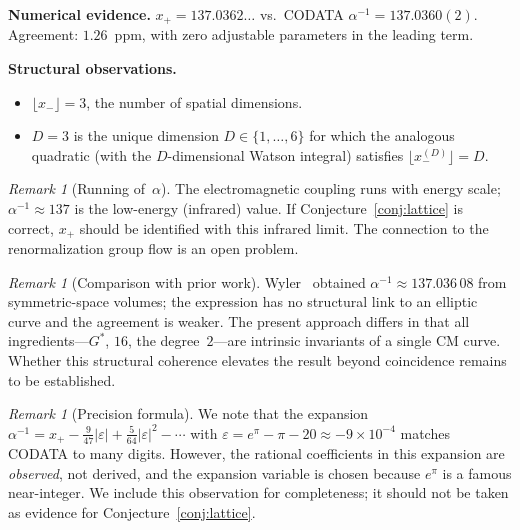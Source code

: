 \documentclass[12pt,reqno]{amsart}
\theoremstyle{definition}
\theoremstyle{remark}
\newtheorem{remark}[theorem]{Remark}
\newcommand{\Gstar}{G^{\!*}}
\newcommand{\abs}[1]{\lvert #1 \rvert}
\begin{document}
\noindent\textbf{Numerical evidence.}
$x_{+}=137.0362\ldots$ vs.\ CODATA $\alpha^{-1}=137.0360(2)$.
Agreement: $1.26$~ppm, with zero adjustable parameters in the leading term.

\smallskip\noindent\textbf{Structural observations.}
\begin{itemize}
  \item $\lfloor x_{-}\rfloor = 3$, the number of spatial dimensions.
  \item $D=3$ is the unique dimension $D\in\{1,\ldots,6\}$ for which the
    analogous quadratic (with the $D$-dimensional Watson integral) satisfies
    $\lfloor x_{-}^{(D)}\rfloor = D$.
\end{itemize}

\begin{remark}[Running of~$\alpha$]\label{rem:running}
The electromagnetic coupling runs with energy scale; $\alpha^{-1}\approx 137$
is the low-energy (infrared) value.  If Conjecture~\ref{conj:lattice} is
correct, $x_{+}$ should be identified with this infrared limit.  The
connection to the renormalization group flow is an open problem.
\end{remark}

\begin{remark}[Comparison with prior work]\label{rem:wyler}
Wyler~\cite{Wyler} obtained $\alpha^{-1}\approx 137.036\,08$ from
symmetric-space volumes; the expression has no structural link to an elliptic
curve and the agreement is weaker.
The present approach differs in that all ingredients---$\Gstar$, $16$, the
degree~$2$---are intrinsic invariants of a single CM curve.  Whether this
structural coherence elevates the result beyond coincidence remains to be
established.
\end{remark}

\begin{remark}[Precision formula]\label{rem:precision}
We note that the expansion
$\alpha^{-1} = x_{+} - \tfrac{9}{47}\abs{\varepsilon}
+ \tfrac{5}{64}\abs{\varepsilon}^{2} - \cdots$
with $\varepsilon = e^{\pi}-\pi-20\approx -9\times 10^{-4}$
matches CODATA to many digits.  However, the rational coefficients in this
expansion are \emph{observed}, not derived, and the expansion variable is
chosen because $e^{\pi}$ is a famous near-integer.  We include this observation
for completeness; it should not be taken as evidence for
Conjecture~\ref{conj:lattice}.
\end{remark}


\end{document}
